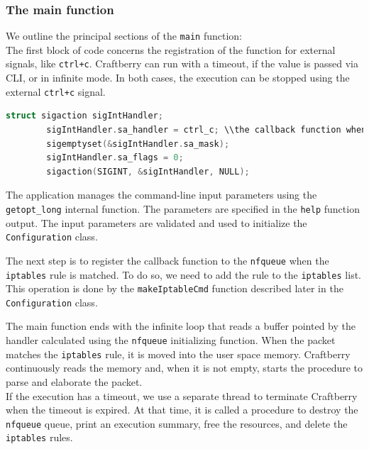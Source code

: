 \documentclass[12pt]{article}
\begin{document}
	\subsubsection{The main function}

	We outline the principal sections of the \lstinline{main} function:\\
	The first block of code concerns the registration of the function for external signals, like \lstinline{ctrl+c}. Craftberry can run with a timeout, if the value is passed via CLI, or in infinite mode. In both cases, the execution can be stopped using the external \lstinline{ctrl+c} signal.\\
	\bigbreak

	\begin{lstlisting}[frame=single, language=C++]
		struct sigaction sigIntHandler;
		sigIntHandler.sa_handler = ctrl_c; \\the callback function when the signal is emitted
		sigemptyset(&sigIntHandler.sa_mask);
		sigIntHandler.sa_flags = 0;
		sigaction(SIGINT, &sigIntHandler, NULL);
	\end{lstlisting}
	\bigbreak
	
	The application manages the command-line input parameters using the \lstinline{getopt_long} internal function. The parameters are specified in the \lstinline{help} function output. The input parameters are validated and used to initialize the \lstinline{Configuration} class.\\
	\bigbreak

	The next step is to register the callback function to the \lstinline{nfqueue} when the \lstinline{iptables} rule is matched. To do so, we need to add the rule to the \lstinline{iptables} list. This operation is done by the \lstinline{makeIptableCmd} function described later in the \lstinline{Configuration} class.\\
	\bigbreak

	The main function ends with the infinite loop that reads a buffer pointed by the handler calculated using the \lstinline{nfqueue} initializing function. When the packet matches the \lstinline{iptables} rule, it is moved into the user space memory. Craftberry continuously reads the memory and, when it is not empty, starts the procedure to parse and elaborate the packet.\\

	If the execution has a timeout, we use a separate thread to terminate Craftberry when the timeout is expired. At that time, it is called a procedure to destroy the \lstinline{nfqueue} queue, print an execution summary, free the resources, and delete the \lstinline{iptables} rules.
\end{document}

